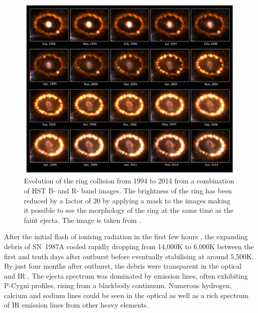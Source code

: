 \begin{figure}
\centering
\includegraphics[clip=true,scale=0.4,trim= 0 0 0 0]{chapters/chapter5/images/HST_ring.png}
\caption{Evolution of the ring collision from 1994 to 2014 from a combination of HST B- and R- band images.  The brightness of the ring has been reduced by a factor of 20 by applying a mask to the images making it possible to see the morphology of the ring at the same time as the faint ejecta.  The image is taken from \citep{Fransson2015}.}
\label{HST_ring}
\end{figure}

After the initial flash of ionising radiation in the first few hours \citep{Ensman1992}, the expanding debris of SN~1987A cooled rapidly dropping from 14,000K to 6,000K between the first and tenth days after outburst \citep{Kirshner1987} before eventually stabilising at around 5,500K.  By just four months after outburst, the debris were transparent in the optical and IR \citep{McCray1993}.  The ejecta spectrum was dominated by emission lines, often exhibiting P-Cygni profiles, rising from a blackbody continuum.  Numerous hydrogen, calcium and sodium lines could be seen in the optical as well as a rich spectrum of IR emission lines  from other heavy elements.  

